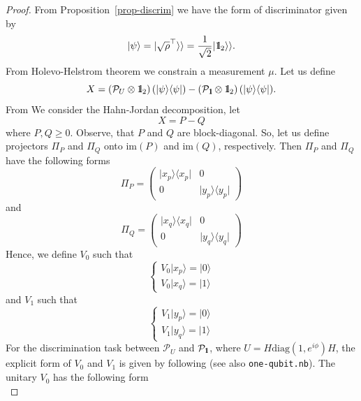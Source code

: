 \documentclass[preprint,12pt, a4paper]{elsarticle}
\newcommand{\ket}[1]{\ensuremath{|#1\rangle}}
\newcommand{\bra}[1]{\ensuremath{\langle#1|}}
\newcommand{\ketbra}[2]{\ensuremath{\ket{#1}\bra{#2}}}
\newcommand{\proj}[1]{\ensuremath{\ketbra{#1}{#1}}}
\newcommand{\1}{{\rm 1\hspace{-0.9mm}l}}
\newcommand{\Id}{{\rm 1\hspace{-0.9mm}l}}
\newcommand{\PP}{\mathcal{P}}
\newcommand{\diag}{\mathrm{diag}}
\begin{document}
\begin{proof}
From Proposition~\ref{prop-discrim} we have the form of discriminator given by
\begin{equation}
\ket{\psi} = | \sqrt{\rho}^\top \rangle \rangle = \frac{1}{\sqrt{2}} |\Id_2 
\rangle \rangle. 
\end{equation}
From Holevo-Helstrom theorem  we constrain a measurement $\mu$.  
Let us define \begin{equation}
X  = \left( \PP_U \otimes \Id_2 \right)(\proj{\psi}) -  \left( \PP_\Id 
\otimes \Id_2 \right)(\proj{\psi}).
\end{equation} From 
We consider the Hahn-Jordan decomposition, let \begin{equation}
X = P - Q
\end{equation}
where $P, Q \ge 0 $. Observe, that $P $ and $Q$ are block-diagonal. 
So, let us define projectors $\Pi_P$ and $\Pi_Q$ onto  $\text{im}(P)$ and $\text{im}(Q)$, 
respectively. Then  $\Pi_P$ and $\Pi_Q$ have the following forms
\begin{equation}
\Pi_P = \left(\begin{array}{cc}\proj{x_p}&0\\0&\proj{y_p}\end{array}\right) 
\end{equation}
and 
\begin{equation}
\Pi_Q = \left(\begin{array}{cc}\proj{x_q}&0\\0&\proj{y_q}\end{array}\right) 
\end{equation}
Hence, we define $V_0$ such that
\begin{equation}
\begin{cases} V_0 \ket{x_p} = \ket{0} \\ V_0 \ket{x_q} = \ket{1} \end{cases}
\end{equation}
and $V_1$ such that
\begin{equation}
\begin{cases} 
V_1 \ket{y_p} = \ket{0} \\ 
V_1 \ket{y_q} = \ket{1}
\end{cases} 
\end{equation}
For the discrimination task between $\PP_{U}$ and $\PP_{\Id}$, where $U = H \diag(1, e^{i \phi })H$, the explicit form of $V_0$ and $V_1$ is given by following (see also \texttt{one-qubit.nb}).
The unitary $V_0$ 
has the following form
\begin{equation}

\end{equation}
\end{proof}
\end{document}
